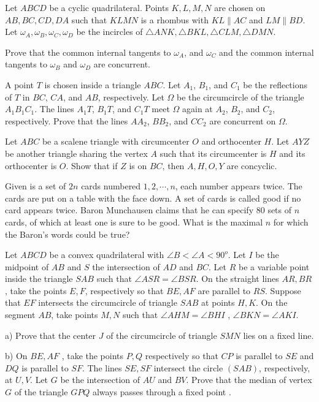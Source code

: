 \documentclass[11pt]{scrartcl}
\begin{document}
\begin{problem}[5299971832672937326]
Let $ABCD$ be a cyclic quadrilateral. Points $K, L, M, N$ are chosen on $AB, BC, CD, DA$ such that $KLMN$ is a rhombus with $KL \parallel AC$ and $LM \parallel BD$. Let $\omega_A, \omega_B, \omega_C, \omega_D$ be the incircles of $\triangle ANK, \triangle BKL, \triangle CLM, \triangle DMN$.

Prove that the common internal tangents to $\omega_A$, and $\omega_C$ and the common internal tangents to $\omega_B$ and $\omega_D$ are concurrent.
\end{problem}
\begin{problem}[2918584823978789760]
A point $T$ is chosen inside a triangle $ABC$. Let $A_1$, $B_1$, and $C_1$ be the reflections of $T$ in $BC$, $CA$, and $AB$, respectively. Let $\Omega$ be the circumcircle of the triangle $A_1B_1C_1$. The lines $A_1T$, $B_1T$, and $C_1T$ meet $\Omega$ again at $A_2$, $B_2$, and $C_2$, respectively. Prove that the lines $AA_2$, $BB_2$, and $CC_2$ are concurrent on $\Omega$.
\end{problem}
\begin{problem}[4948608980214807448]
	Let $ABC$ be a scalene triangle with circumcenter $O$ and orthocenter $H$. Let $AYZ$ be another triangle sharing the vertex $A$ such that its circumcenter is $H$ and its orthocenter is $O$. Show that if $Z$ is on $BC$, then $A,H,O,Y$ are concyclic.
\end{problem}
\begin{problem}[2989958142304279488]
Given is a set of $2n$ cards numbered $1,2, \cdots, n$, each number appears twice. The cards are put on a table with the face down. A set of cards is called good if no card appears twice. Baron Munchausen claims that he can specify $80$ sets of $n$ cards, of which at least one is sure to be good. What is the maximal $n$ for which the Baron's words could be true?
\end{problem}
\begin{problem}[1613309914397651478]
Let $ABCD$ be a convex quadrilateral with $\angle B < \angle A < 90^{o}$. Let $I$ be the midpoint of $AB$ and $S$ the intersection of $AD$ and $BC$. Let $R$ be a variable point inside the triangle $SAB$ such that $\angle ASR = \angle BSR$. On the straight lines $AR, BR$ , take the points $E, F$, respectively so that $BE , AF$ are parallel to $RS$. Suppose that $EF$ intersects the circumcircle of triangle $SAB$ at points $H, K$. On the segment $AB$, take points $M , N$ such that $\angle AHM =\angle BHI$ , $\angle BKN = \angle AKI$.

a) Prove that the center $J$ of the circumcircle of triangle $SMN$ lies on a fixed line.

b) On $BE, AF$ , take the points $P, Q$ respectively so that $CP$ is parallel to $SE$ and $DQ$ is parallel to $SF$. The lines $SE, SF$ intersect the circle $(SAB)$, respectively, at $U, V$. Let $G$ be the intersection of $AU$ and $BV$. Prove that the median of vertex $G$ of the triangle $GPQ$ always passes through a fixed point .
\end{problem}
\end{document}
